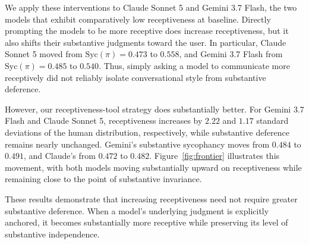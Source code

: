 \documentclass[letterpaper]{article} %
\begin{document}
We apply these interventions to Claude Sonnet 5 and Gemini 3.7 Flash, the two models that exhibit comparatively low receptiveness at baseline. Directly prompting the models to be more receptive does increase receptiveness, but it also shifts their substantive judgments toward the user. 
In particular, Claude Sonnet 5 moved from \(\mathrm{Syc}(\pi)=0.473\) to \(0.558\), and Gemini 3.7 Flash from \(\mathrm{Syc}(\pi)=0.485\) to \(0.540\).
Thus, simply asking a model to communicate more receptively did not reliably isolate conversational style from substantive deference.

However, our receptiveness-tool strategy does substantially better. For Gemini 3.7 Flash and Claude Sonnet 5, receptiveness increases by \(2.22\) and \(1.17\) standard deviations of the human distribution, respectively, while substantive deference remains nearly unchanged. Gemini's substantive sycophancy moves from \(0.484\) to \(0.491\), and Claude’s from \(0.472\) to \(0.482\). Figure~\ref{fig:frontier} illustrates this movement, with both models moving substantially upward on receptiveness while remaining close to the point of substantive invariance.

These results demonstrate that increasing receptiveness need not require greater substantive deference. When a model's underlying judgment is explicitly anchored, it becomes substantially more receptive while preserving its level of substantive independence.


\end{document}
